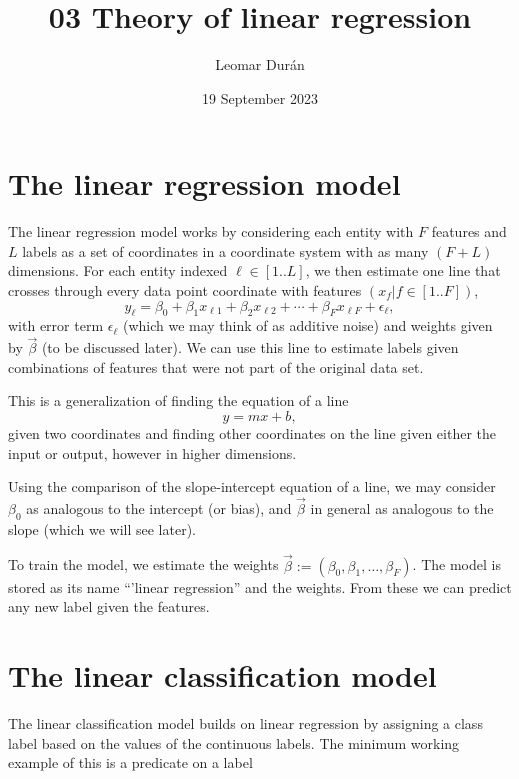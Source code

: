\documentclass{article}
\title{03 Theory of linear regression}
\author{Leomar Dur\'an}
\date{19 September 2023}
\begin{document}
\maketitle

\section{The linear regression model}

The linear regression model works by considering each entity with $F$ features and $L$ labels as a set of coordinates in a coordinate system with as many $(F+L)$ dimensions.
For each entity indexed $\ell \in [1..L]$, we then estimate one line that crosses through every data point coordinate with features $(x_f | f \in [1..F])$,
\begin{equation}
    y_\ell = \beta_0 + \beta_1x_{\ell1} + \beta_2x_{\ell2} + \cdots + \beta_F x_{\ell F} + \epsilon_\ell,
\end{equation}
with error term $\epsilon_\ell$ (which we may think of as additive noise) and weights given by $\vec\beta$ (to be discussed later).
We can use this line to estimate labels given combinations of features that were not part of the original data set.

This is a generalization of finding the equation of a line
\begin{equation}
    y = mx + b,
\end{equation}
given two coordinates
and finding other coordinates on the line given either the input or output,
however in higher dimensions.

Using the comparison of the slope-intercept equation of a line, we may consider $\beta_0$ as analogous to the intercept (or bias), and $\vec\beta$ in general as analogous to the slope (which we will see later).

To train the model, we estimate the weights $\vec\beta := (\beta_0, \beta_1, \dots, \beta_F)$. The model is stored as its name ``'linear regression'' and the weights. From these we can predict any new label given the features.

\section{The linear classification model}

The linear classification model builds on linear regression by assigning a class label based on the values of the continuous labels. The minimum working example of this is a predicate on a label
\end{document}
